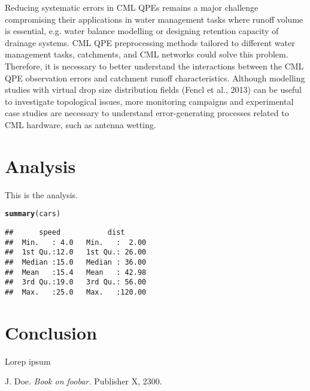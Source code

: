 \documentclass{ctuthesis}\usepackage[]{graphicx}\usepackage[]{color}
\makeatletter
\newcommand{\hlstd}[1]{\textcolor[rgb]{0.345,0.345,0.345}{#1}}%
\newcommand{\hlkwd}[1]{\textcolor[rgb]{0.737,0.353,0.396}{\textbf{#1}}}%
\newenvironment{kframe}{%
 \def\at@end@of@kframe{}%
 \ifinner\ifhmode%
  \def\at@end@of@kframe{\end{minipage}}%
  \begin{minipage}{\columnwidth}%
 \fi\fi%
 \def\FrameCommand##1{\hskip\@totalleftmargin \hskip-\fboxsep
 \colorbox{shadecolor}{##1}\hskip-\fboxsep
     \hskip-\linewidth \hskip-\@totalleftmargin \hskip\columnwidth}%
 \MakeFramed {\advance\hsize-\width
   \@totalleftmargin\z@ \linewidth\hsize
   \@setminipage}}%
 {\par\unskip\endMakeFramed%
 \at@end@of@kframe}
\newenvironment{knitrout}{}{} %
\makeatother
\begin{document}
Reducing systematic errors in CML QPEs remains a major challenge compromising their applications in water management tasks where runoff volume is essential, e.g. water balance modelling or designing retention capacity of drainage systems. CML QPE preprocessing methods tailored to different water management tasks, catchments, and CML networks could solve this problem. Therefore, it is necessary to better understand the interactions between the CML QPE observation errors and catchment runoff characteristics. Although modelling studies with virtual drop size distribution fields (Fencl et al., 2013) can be useful to investigate topological issues, more monitoring campaigns and experimental case studies are necessary to understand error-generating processes related to CML hardware, such as antenna wetting.





        
        
        


\chapter{Analysis}
This is the analysis.

\begin{knitrout}
\color{fgcolor}\begin{kframe}
\begin{alltt}
\hlkwd{summary}\hlstd{(cars)}
\end{alltt}
\begin{verbatim}
##      speed           dist       
##  Min.   : 4.0   Min.   :  2.00  
##  1st Qu.:12.0   1st Qu.: 26.00  
##  Median :15.0   Median : 36.00  
##  Mean   :15.4   Mean   : 42.98  
##  3rd Qu.:19.0   3rd Qu.: 56.00  
##  Max.   :25.0   Max.   :120.00
\end{verbatim}
\end{kframe}
\end{knitrout}
        
        
        
        \chapter{Conclusion}
        Lorep ipsum \cite{doe}
        
        
        \begin{thebibliography}{1}
         J. Doe. \emph{Book on foobar.} Publisher X, 2300.
        \end{thebibliography}
        
    
\end{document}
